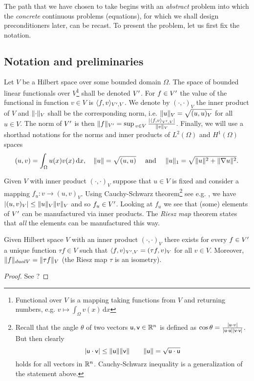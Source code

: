 The path that we have chosen to take begins with an \textit{abstract} problem into which the
\textit{concrete} continuous problems (equations), for which we shall design preconditioners later, 
can be recast. To present the problem, let us first fix the notation.

\subsection{Notation and preliminaries}
Let $V$ be a Hilbert space over some bounded domain $\Omega$. The space of bounded
linear functionals over $V$\footnote{Functional over $V$ is a mapping taking functions 
from $V$ and returning numbers, e.g. $v \mapsto \int_{\Omega} v(x)\,\mathrm{d}x$} 
shall be denoted $V^{\prime}$. For $f\in V^{\prime}$ the value of the functional in function 
$v\in V$ is $\langle f, v\rangle_{V^{\prime}, V}$. We denote by $(\cdot, \cdot)_V$
the inner product of $V$ and $\lVert\cdot\rVert_V$ shall be the corresponding norm,
i.e. $\lVert u\rVert_V=\sqrt{(u, u)_V}$ for all $u\in V$. The norm of $V^{\prime}$ is then 
$\norm{f}_{\dual{V}}=\sup_{v\in V}\tfrac{\semi{\brack{f, v}_{\dual{V},
V}}}{\norm{v}_V}$. Finally, we will use a shorthad notations for the norms and
inner products of $L^2(\Omega)$ and $H^1(\Omega)$ spaces
%
\[
  (u, v) = \int_{\Omega} u(x) v(x)\,\mathrm{d}x,
  \quad
  \lVert u\rVert = \sqrt{(u, u)}
  \quad
  \mbox{ and }
  \quad
  \lVert u\rVert_1 = \sqrt{\lVert u\rVert^2 + \lVert\nabla{u}\rVert^2}.
\]
%

Given $V$ with inner product $(\cdot, \cdot)_V$ suppose that $u\in V$ is fixed and
consider a mapping $f_u: v\rightarrow (u, v)_V$. Using Cauchy-Schwarz theorem\footnote{
  Recall that the angle $\theta$ of two vectors $\mathsf{u}, \mathsf{v} \in \mathbb{R}^n$ is 
  defined as $\cos{\theta}=\frac{
    \lvert\mathsf{u}\cdot {v}\rvert
  }
  {
    \lvert\mathsf{u}\cdot\mathsf{u}\rvert\lvert\mathsf{v}\cdot\mathsf{v}\rvert
  }$. But then clearly
\[
  \lvert\mathsf{u}\cdot\mathsf{v}\rvert 
  \leq \lVert\mathsf{u}\rVert\lVert\mathsf{v}\rVert
  \quad\quad
  \lVert\mathsf{u}\rVert=\sqrt{\mathsf{u}\cdot\mathsf{u}}
\]
holds for all vectors in $\mathbb{R}^n$. Cauchy-Schwarz inequality is a generalization
of the statement above.}
%
see e.g. , we have $\lvert(u, v)_V\rvert\leq\lVert u\rVert_V\lVert v\rVert_V$ and so
$f_u\in V^{\prime}$. Looking at $f_u$ we see that (some) elements of $V^{\prime}$ can 
be manufactured via inner products. The \textit{Riesz map} theorem states that
\textit{all} the elements can be manufactured this way.

\begin{theorem}[Riesz]\label{thm:riesz}
  Given Hilbert space $V$ with an inner product $(\cdot, \cdot)_V$ there exists
  for every $f\in V^{\prime}$ a unique function $\tau f\in V$ such that $\langle f,
  v\rangle_{V^{\prime}, V}=(\tau f, v)_V$ for all $v\in V$. 
  Moreover, $\lVert f\rVert_{dual{V}}=\lVert\tau f\rVert_V$ (the Riesz map $\tau$ is an
  isometry).
\end{theorem}
\begin{proof}
See ?
\end{proof}

